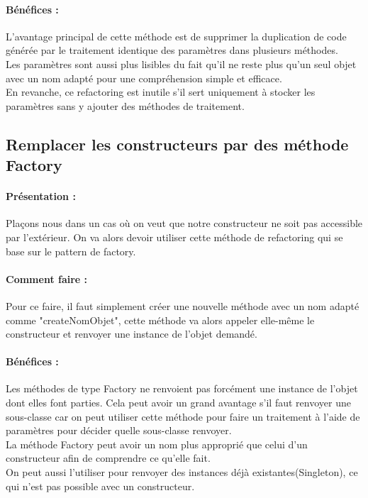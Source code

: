 \documentclass[a4paper,twoside,12pt,openright]{report}
\begin{document}
\paragraph{Bénéfices :}
L'avantage principal de cette méthode est de supprimer la duplication de code générée par le traitement identique des paramètres dans plusieurs méthodes.\\
Les paramètres sont aussi plus lisibles du fait qu'il ne reste plus qu'un seul objet avec un nom adapté pour une compréhension simple et efficace.\\
En revanche, ce refactoring est inutile s'il sert uniquement à stocker les paramètres sans y ajouter des méthodes de traitement.\\

\subsection{Remplacer les constructeurs par des méthode Factory}
\paragraph{Présentation :}
Plaçons nous dans un cas où on veut que notre constructeur ne soit pas accessible par l'extérieur.
On va alors devoir utiliser cette méthode de refactoring qui se base sur le pattern de factory.

\paragraph{Comment faire :}
Pour ce faire, il faut simplement créer une nouvelle méthode avec un nom adapté comme "createNomObjet", cette méthode va alors appeler elle-même le constructeur et renvoyer une instance de l'objet demandé.

\paragraph{Bénéfices :}
Les méthodes de type Factory ne renvoient pas forcément une instance de l'objet dont elles font parties. Cela peut avoir un grand avantage s'il faut renvoyer une sous-classe car on peut utiliser cette méthode pour faire un traitement à l'aide de paramètres pour décider quelle sous-classe renvoyer.\\
La méthode Factory peut avoir un nom plus approprié que celui d'un constructeur afin de comprendre ce qu'elle fait.\\
On peut aussi l'utiliser pour renvoyer des instances déjà existantes(Singleton), ce qui n'est pas possible avec un constructeur.\\
\end{document}
